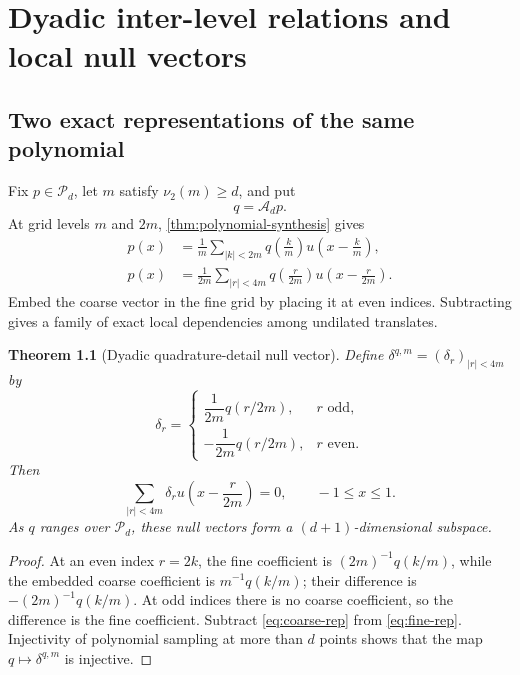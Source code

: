 \documentclass[11pt,oneside]{book}
\newtheorem{theorem}{Theorem}[chapter]
\theoremstyle{definition}
\theoremstyle{remark}
\newcommand{\Pp}{\mathcal P}
\newcommand{\Aop}{\mathcal A}
\newcommand{\vtwo}{\nu_2}
\begin{document}
\chapter{Dyadic inter-level relations and local null vectors}
\label{ch:dyadic-null}

\section{Two exact representations of the same polynomial}
Fix \(p\in\Pp_d\), let \(m\) satisfy \(\vtwo(m)\ge d\), and put
\[
 q=\Aop_dp.
\]
At grid levels \(m\) and \(2m\), \cref{thm:polynomial-synthesis} gives
\begin{align}
 p(x)&=\frac1m\sum_{|k|<2m}q\!\left(\frac{k}{m}\right)
 u\!\left(x-\frac{k}{m}\right),\label{eq:coarse-rep}\\
 p(x)&=\frac1{2m}\sum_{|r|<4m}q\!\left(\frac{r}{2m}\right)
 u\!\left(x-\frac{r}{2m}\right).
 \label{eq:fine-rep}
\end{align}
Embed the coarse vector in the fine grid by placing it at even indices.  Subtracting gives a family of exact local dependencies among undilated translates.

\begin{theorem}[Dyadic quadrature-detail null vector]
\label{thm:dyadic-null}
Define \(\delta^{q,m}=(\delta_r)_{|r|<4m}\) by
\begin{equation}
 \delta_r=
 \begin{cases}
 \dfrac1{2m}q(r/2m),&r\text{ odd},\\[0.7em]
 -\dfrac1{2m}q(r/2m),&r\text{ even}.
 \end{cases}
 \label{eq:dyadic-null-coefficients}
\end{equation}
Then
\begin{equation}
 \sum_{|r|<4m}\delta_r
 u\!\left(x-\frac{r}{2m}\right)=0,
 \qquad -1\le x\le1.
 \label{eq:dyadic-null-identity}
\end{equation}
As \(q\) ranges over \(\Pp_d\), these null vectors form a \((d+1)\)-dimensional subspace.
\end{theorem}

\begin{proof}
At an even index \(r=2k\), the fine coefficient is
\((2m)^{-1}q(k/m)\), while the embedded coarse coefficient is
\(m^{-1}q(k/m)\); their difference is
\(-(2m)^{-1}q(k/m)\).  At odd indices there is no coarse coefficient, so the difference is the fine coefficient.  Subtract \cref{eq:coarse-rep} from \cref{eq:fine-rep}.  Injectivity of polynomial sampling at more than \(d\) points shows that the map \(q\mapsto\delta^{q,m}\) is injective.
\end{proof}
\end{document}
